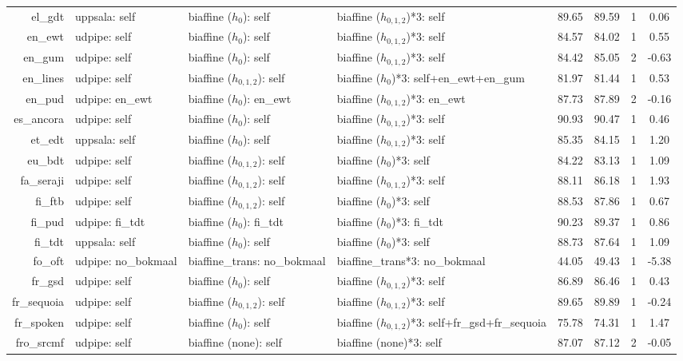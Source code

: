 \documentclass[11pt,a4paper]{article}
\begin{document}
\begin{table}[t]
\begin{tabular}{rlllcccc}
el\_gdt & uppsala: self & biaffine ($h_{0}$): self & biaffine ($h_{0,1,2}$)*3: self & 89.65 & 89.59 & 1 & 0.06 \\
en\_ewt & udpipe: self & biaffine ($h_{0}$): self & biaffine ($h_{0,1,2}$)*3: self & 84.57 & 84.02 & 1 & 0.55 \\
en\_gum & udpipe: self & biaffine ($h_{0}$): self & biaffine ($h_{0,1,2}$)*3: self & 84.42 & 85.05 & 2 & -0.63 \\
en\_lines & udpipe: self & biaffine ($h_{0,1,2}$): self & biaffine ($h_{0}$)*3: self+en\_ewt+en\_gum & 81.97 & 81.44 & 1 & 0.53 \\
en\_pud & udpipe: en\_ewt & biaffine ($h_{0}$): en\_ewt & biaffine ($h_{0,1,2}$)*3: en\_ewt & 87.73 & 87.89 & 2 & -0.16 \\
es\_ancora & udpipe: self & biaffine ($h_{0}$): self & biaffine ($h_{0,1,2}$)*3: self & 90.93 & 90.47 & 1 & 0.46 \\
et\_edt & uppsala: self & biaffine ($h_{0}$): self & biaffine ($h_{0,1,2}$)*3: self & 85.35 & 84.15 & 1 & 1.20 \\
eu\_bdt & udpipe: self & biaffine ($h_{0,1,2}$): self & biaffine ($h_{0}$)*3: self & 84.22 & 83.13 & 1 & 1.09 \\
fa\_seraji & udpipe: self & biaffine ($h_{0,1,2}$): self & biaffine ($h_{0,1,2}$)*3: self & 88.11 & 86.18 & 1 & 1.93 \\
fi\_ftb & udpipe: self & biaffine ($h_{0,1,2}$): self & biaffine ($h_{0}$)*3: self & 88.53 & 87.86 & 1 & 0.67 \\
fi\_pud & udpipe: fi\_tdt & biaffine ($h_{0}$): fi\_tdt & biaffine ($h_{0}$)*3: fi\_tdt & 90.23 & 89.37 & 1 & 0.86 \\
fi\_tdt & uppsala: self & biaffine ($h_{0}$): self & biaffine ($h_{0}$)*3: self & 88.73 & 87.64 & 1 & 1.09 \\
fo\_oft & udpipe: no\_bokmaal & biaffine\_trans: no\_bokmaal & biaffine\_trans*3: no\_bokmaal & 44.05 & 49.43 & 1 & -5.38 \\
fr\_gsd & udpipe: self & biaffine ($h_{0}$): self & biaffine ($h_{0,1,2}$)*3: self & 86.89 & 86.46 & 1 & 0.43 \\
fr\_sequoia & udpipe: self & biaffine ($h_{0,1,2}$): self & biaffine ($h_{0,1,2}$)*3: self & 89.65 & 89.89 & 1 & -0.24 \\
fr\_spoken & udpipe: self & biaffine ($h_{0}$): self & biaffine ($h_{0,1,2}$)*3: self+fr\_gsd+fr\_sequoia & 75.78 & 74.31 & 1 & 1.47 \\
fro\_srcmf & udpipe: self & biaffine (none): self & biaffine (none)*3: self & 87.07 & 87.12 & 2 & -0.05 \\

\end{tabular}
\end{table}
\end{document}

